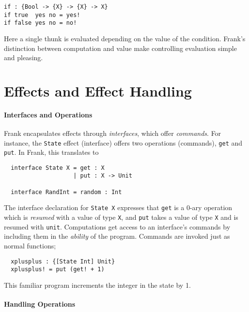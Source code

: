 \documentclass[msc,deptreport,cs]{infthesis} %
\newcommand{\code}[1]{\lstinline{#1}}
\newcommand{\todo}[1]
           {{\par\noindent\small\color{RoyalPurple}
  \framebox{\parbox{\dimexpr\linewidth-2\fboxsep-2\fboxrule}
    {\textbf{TODO:} #1}}}}
\begin{document}
\begin{lstlisting}
if : {Bool -> {X} -> {X} -> X}
if true  yes no = yes!
if false yes no = no!
\end{lstlisting}

\noindent Here a single thunk is evaluated depending on the value of the
condition. Frank's distinction between computation and value make controlling
evaluation simple and pleasing.



\section{Effects and Effect Handling}
\label{sec:effects}

\paragraph*{Interfaces and Operations}

Frank encapsulates effects through \emph{interfaces}, which offer
\emph{commands}. For instance, the \code{State} effect (interface) offers two
operations (commands), \code{get} and \code{put}. In Frank, this translates to

\begin{lstlisting}
  interface State X = get : X
                    | put : X -> Unit

  interface RandInt = random : Int
\end{lstlisting}

The interface declaration for \code{State X} expresses that \code{get} is a
0-ary operation which is \emph{resumed} with a value of type \code{X}, and
\code{put} takes a value of type \code{X} and is resumed with \code{unit}.
Computations get access to an interface's commands by including them in the
\emph{ability} of the program. Commands are invoked just as normal functions;

\begin{lstlisting}
  xplusplus : {[State Int] Unit}
  xplusplus! = put (get! + 1)
\end{lstlisting}

\noindent This familiar program increments the integer in the state by 1.

\paragraph*{Handling Operations}
\end{document}
